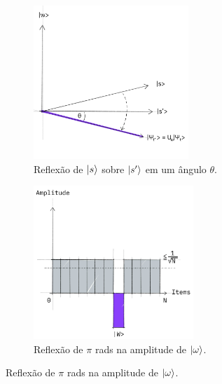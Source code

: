\begin{figure}[ht!]
    \centering
    \captionsetup{justification=centering}
    \caption{Reflexão dos estados $\ket{s}$ e $\ket{\omega}$, respectivamente.}

    \begin{subfigure}[b]{0.4\textwidth}
        \centering
        \includegraphics[width=\textwidth]{Imagens/rotacao.png}
        \caption{Reflexão de $\ket{s}$ sobre $\ket{s'}$ em um \^{a}ngulo $\theta$.}
        \label{subfig:rotacao}
    \end{subfigure}
    \hfill
    \begin{subfigure}[b]{0.45\textwidth}
        \centering
        \includegraphics[width=\textwidth]{Imagens/reflexao.png}
        \caption{Reflexão de $\pi$ rads na amplitude de $\ket{\omega}$.}
        \label{subfig:reflexao}
    \end{subfigure}


\end{figure}
